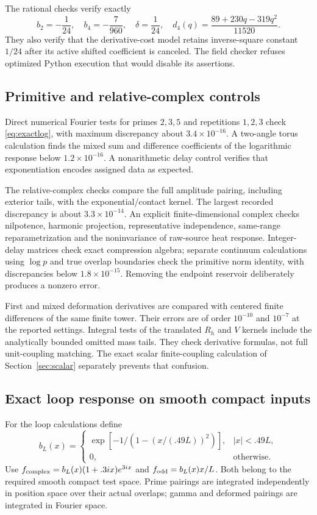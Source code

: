 \documentclass[11pt]{article}
\numberwithin{equation}{section}
\theoremstyle{definition}
\theoremstyle{remark}
\begin{document}
The rational checks verify exactly
\begin{equation}
 b_2=-\frac1{24},\quad b_4=-\frac7{960},\quad
 \delta=\frac1{24},\quad
 d_4(q)=\frac{89+230q-319q^2}{11520}.
\end{equation}
They also verify that the derivative-cost model retains inverse-square constant $1/24$ after its active shifted coefficient is canceled. The field checker refuses optimized Python execution that would disable its assertions.

\subsection{Primitive and relative-complex controls}
Direct numerical Fourier tests for primes $2,3,5$ and repetitions $1,2,3$ check \eqref{eq:exactlog}, with maximum discrepancy about $3.4\times10^{-16}$. A two-angle torus calculation finds the mixed sum and difference coefficients of the logarithmic response below $1.2\times10^{-16}$. A nonarithmetic delay control verifies that exponentiation encodes assigned data as expected.

The relative-complex checks compare the full amplitude pairing, including exterior tails, with the exponential/contact kernel. The largest recorded discrepancy is about $3.3\times10^{-14}$. An explicit finite-dimensional complex checks nilpotence, harmonic projection, representative independence, same-range reparametrization and the noninvariance of raw-source heat response. Integer-delay matrices check exact compression algebra; separate continuum calculations using $\log p$ and true overlap boundaries check the primitive norm identity, with discrepancies below $1.8\times10^{-15}$. Removing the endpoint reservoir deliberately produces a nonzero error.

First and mixed deformation derivatives are compared with centered finite differences of the same finite tower. Their errors are of order $10^{-10}$ and $10^{-7}$ at the reported settings. Integral tests of the translated $R_h$ and $V$ kernels include the analytically bounded omitted mass tails. They check derivative formulas, not full unit-coupling matching. The exact scalar finite-coupling calculation of Section~\ref{sec:scalar} separately prevents that confusion.

\subsection{Exact loop response on smooth compact inputs}
For the loop calculations define
\begin{equation}
 b_L(x)=
 \begin{cases}
 \exp[-1/(1-(x/(.49L))^2)],&|x|<.49L,\\
 0,&\text{otherwise}.
 \end{cases}
\end{equation}
Use $f_{\rm complex}=b_L(x)(1+.3ix)e^{3ix}$ and $f_{\rm odd}=b_L(x)x/L$. Both belong to the required smooth compact test space. Prime pairings are integrated independently in position space over their actual overlaps; gamma and deformed pairings are integrated in Fourier space.
\end{document}
